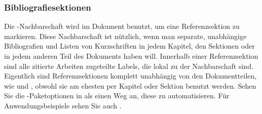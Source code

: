 \documentclass{ltxdockit}[2011/03/25]
\begin{document}
\begin{ltxexample}
\end{ltxexample}

\subsubsection{Bibliografiesektionen} \label{use:bib:sec}

Die -Nachbarschaft wird im Dokument benutzt, um eine
Referenzsektion zu markieren. Diese Nachbarschaft ist nützlich, wenn man
separate, unabhängige Bibliografien und Listen von Kurzschriften in jedem
Kapitel, den Sektionen oder in jedem anderen Teil des Dokuments haben will. Innerhalb
einer Referenzsektion sind alle zitierte Arbeiten zugeteilte Labels, die lokal
zu der Nachbarschaft sind. Eigentlich sind Referenzsektionen komplett unabhängig
von den Dokumentteilen, wie  und , obwohl sie am
ehesten per Kapitel oder Sektion benutzt werden. Sehen Sie die
-Paketoptionen in  als einen Weg an, diese 
zu automatisieren.
Für Anwendungsbeispiele sehen Sie auch .   
\end{document}
